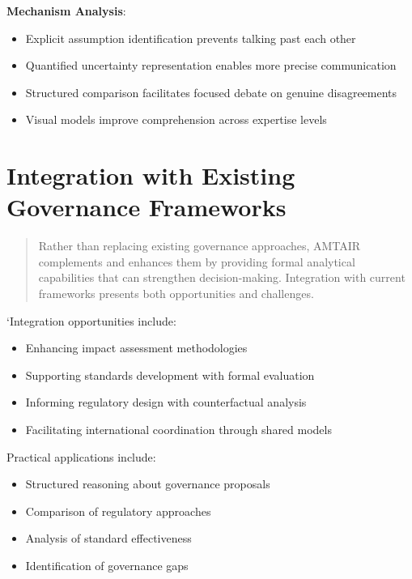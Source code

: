 \documentclass[
  11pt,
  letterpaper,
]{book}
\providecommand{\tightlist}{%
  \setlength{\itemsep}{0pt}\setlength{\parskip}{0pt}}
\begin{document}
\textbf{Mechanism Analysis}:

\begin{itemize}
\tightlist
\item
  Explicit assumption identification prevents talking past each other
\item
  Quantified uncertainty representation enables more precise
  communication
\item
  Structured comparison facilitates focused debate on genuine
  disagreements
\item
  Visual models improve comprehension across expertise levels
\end{itemize}

\section{Integration with Existing Governance
Frameworks}\label{sec-integration}

\begin{quote}
Rather than replacing existing governance approaches, AMTAIR complements
and enhances them by providing formal analytical capabilities that can
strengthen decision-making. Integration with current frameworks presents
both opportunities and challenges.
\end{quote}

`Integration opportunities include:

\begin{itemize}
\tightlist
\item
  Enhancing impact assessment methodologies
\item
  Supporting standards development with formal evaluation
\item
  Informing regulatory design with counterfactual analysis
\item
  Facilitating international coordination through shared models
\end{itemize}

Practical applications include:

\begin{itemize}
\tightlist
\item
  Structured reasoning about governance proposals
\item
  Comparison of regulatory approaches
\item
  Analysis of standard effectiveness
\item
  Identification of governance gaps
\end{itemize}
\end{document}
